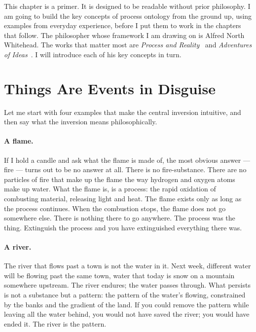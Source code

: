 This chapter is a primer.
It is designed to be readable without prior philosophy.
I am going to build the key concepts of process ontology from the ground up,
using examples from everyday experience, before I put them to work in the
chapters that follow.
The philosopher whose framework I am drawing on is Alfred North Whitehead.
The works that matter most are \textit{Process and Reality}~\citeyearpar{Whitehead1929}
and \textit{Adventures of Ideas}~\citeyearpar{Whitehead1933}.
I will introduce each of his key concepts in turn.

\section{Things Are Events in Disguise}
\label{sec:ch4-events}

Let me start with four examples that make the central inversion intuitive,
and then say what the inversion means philosophically.

\paragraph{A flame.}
If I hold a candle and ask what the flame is made of, the most obvious answer ---
fire --- turns out to be no answer at all.
There is no fire-substance.
There are no particles of fire that make up the flame the way hydrogen and oxygen
atoms make up water.
What the flame is, is a process: the rapid oxidation of combusting material,
releasing light and heat.
The flame exists only as long as the process continues.
When the combustion stops, the flame does not go somewhere else.
There is nothing there to go anywhere.
The process was the thing.
Extinguish the process and you have extinguished everything there was.

\paragraph{A river.}
The river that flows past a town is not the water in it.
Next week, different water will be flowing past the same town, water that
today is snow on a mountain somewhere upstream.
The river endures; the water passes through.
What persists is not a substance but a pattern: the pattern of the water's
flowing, constrained by the banks and the gradient of the land.
If you could remove the pattern while leaving all the water behind, you would
not have saved the river; you would have ended it.
The river is the pattern.

